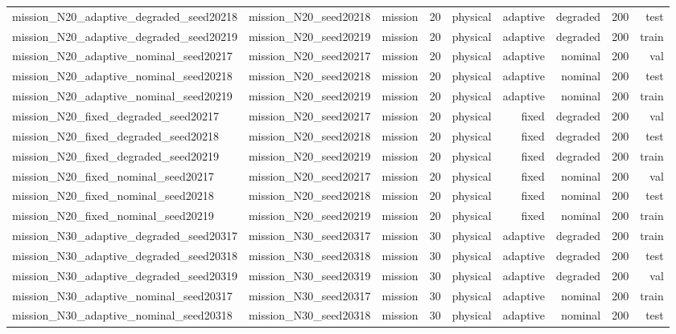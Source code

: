 \begin{tabular}{lrrrrrrrr}
mission\_N20\_adaptive\_degraded\_seed20218 & mission\_N20\_seed20218 & mission & 20 & physical & adaptive & degraded & 200 & test \\
mission\_N20\_adaptive\_degraded\_seed20219 & mission\_N20\_seed20219 & mission & 20 & physical & adaptive & degraded & 200 & train \\
mission\_N20\_adaptive\_nominal\_seed20217 & mission\_N20\_seed20217 & mission & 20 & physical & adaptive & nominal & 200 & val \\
mission\_N20\_adaptive\_nominal\_seed20218 & mission\_N20\_seed20218 & mission & 20 & physical & adaptive & nominal & 200 & test \\
mission\_N20\_adaptive\_nominal\_seed20219 & mission\_N20\_seed20219 & mission & 20 & physical & adaptive & nominal & 200 & train \\
mission\_N20\_fixed\_degraded\_seed20217 & mission\_N20\_seed20217 & mission & 20 & physical & fixed & degraded & 200 & val \\
mission\_N20\_fixed\_degraded\_seed20218 & mission\_N20\_seed20218 & mission & 20 & physical & fixed & degraded & 200 & test \\
mission\_N20\_fixed\_degraded\_seed20219 & mission\_N20\_seed20219 & mission & 20 & physical & fixed & degraded & 200 & train \\
mission\_N20\_fixed\_nominal\_seed20217 & mission\_N20\_seed20217 & mission & 20 & physical & fixed & nominal & 200 & val \\
mission\_N20\_fixed\_nominal\_seed20218 & mission\_N20\_seed20218 & mission & 20 & physical & fixed & nominal & 200 & test \\
mission\_N20\_fixed\_nominal\_seed20219 & mission\_N20\_seed20219 & mission & 20 & physical & fixed & nominal & 200 & train \\
mission\_N30\_adaptive\_degraded\_seed20317 & mission\_N30\_seed20317 & mission & 30 & physical & adaptive & degraded & 200 & train \\
mission\_N30\_adaptive\_degraded\_seed20318 & mission\_N30\_seed20318 & mission & 30 & physical & adaptive & degraded & 200 & test \\
mission\_N30\_adaptive\_degraded\_seed20319 & mission\_N30\_seed20319 & mission & 30 & physical & adaptive & degraded & 200 & val \\
mission\_N30\_adaptive\_nominal\_seed20317 & mission\_N30\_seed20317 & mission & 30 & physical & adaptive & nominal & 200 & train \\
mission\_N30\_adaptive\_nominal\_seed20318 & mission\_N30\_seed20318 & mission & 30 & physical & adaptive & nominal & 200 & test \\

\end{tabular}
